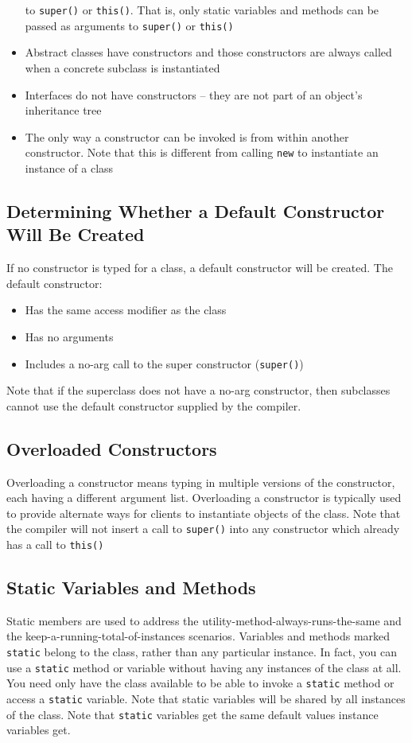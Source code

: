 \begin{itemize}
    to \verb#super()# or \verb#this()#. That is, only static variables and 
    methods can be passed as arguments to \verb#super()# or \verb#this()#
    \item Abstract classes have constructors and those constructors are always 
    called when a concrete subclass is instantiated
    \item Interfaces do not have constructors -- they are not part of an 
    object's inheritance tree
    \item The only way a constructor can be invoked is from within another 
    constructor. Note that this is different from calling \verb#new# to 
    instantiate an instance of a class
\end{itemize}

\subsection{Determining Whether a Default Constructor Will Be Created}
If no constructor is typed for a class, a default constructor will be created.  
The default constructor:
\begin{itemize}
    \item Has the same access modifier as the class
    \item Has no arguments
    \item Includes a no-arg call to the super constructor (\verb#super()#)
\end{itemize}
Note that if the superclass does not have a no-arg constructor, then subclasses 
cannot use the default constructor supplied by the compiler.

\subsection{Overloaded Constructors}
Overloading a constructor means typing in multiple versions of the constructor, 
each having a different argument list. Overloading a constructor is typically 
used to provide alternate ways for clients to instantiate objects of the class.  
Note that the compiler will not insert a call to \verb#super()# into any 
constructor which already has a call to \verb#this()#

\subsection{Static Variables and Methods}
Static members are used to address the utility-method-always-runs-the-same and 
the keep-a-running-total-of-instances scenarios. Variables and methods marked 
\verb#static# belong to the class, rather than any particular instance. In 
fact, you can use a \verb#static# method or variable without having any 
instances of the class at all. You need only have the class available to be 
able to invoke a \verb#static# method or access a \verb#static# variable. Note 
that static variables will be shared by all instances of the class. Note that 
\verb#static# variables get the same default values instance variables get.

